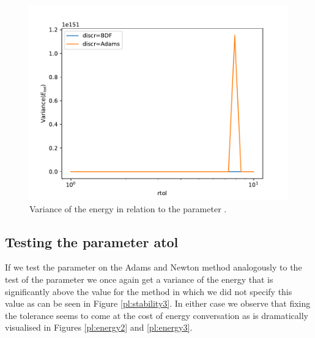 \documentclass{report}
\begin{document}
\begin{figure}[h]
\centering
\begin{minipage}[b]{0.45\textwidth}
\centering
\includegraphics[width=\textwidth]{../Plots/Task4/Figure_304}
\caption{Variance of the energy in relation to the parameter .}
\label{pl:stability2}
\end{minipage}
\end{figure}

\subsection*{Testing the parameter atol}

If we test the  parameter on the Adams and Newton method analogously to the test of the  parameter we once again get a variance of the energy that is significantly above the value for the method in which we did not specify this value as can be seen in Figure \ref{pl:stability3}. In either case we observe that fixing the tolerance seems to come at the cost of energy conversation as is dramatically visualised in Figures \ref{pl:energy2} and \ref{pl:energy3}.
\end{document}
